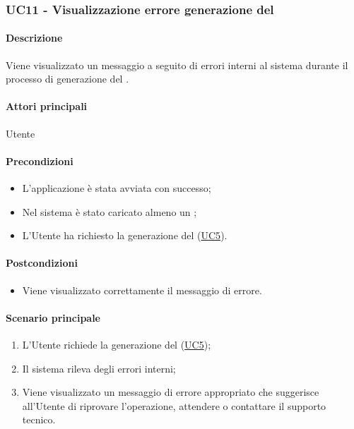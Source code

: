 \subsubsection{UC11 - Visualizzazione errore generazione del }\label{UC11}
\paragraph*{Descrizione}
Viene visualizzato un messaggio a seguito di errori interni al sistema durante il processo di generazione del .

\paragraph*{Attori principali}
Utente

\paragraph*{Precondizioni}
\begin{itemize}
  \item L'applicazione è stata avviata con successo;
  \item Nel sistema è stato caricato almeno un ;
  \item L'Utente ha richiesto la generazione del  (\hyperref[UC5]{UC5}).  
\end{itemize}

\paragraph*{Postcondizioni}
\begin{itemize}
  \item Viene visualizzato correttamente il messaggio di errore.
\end{itemize}

\paragraph*{Scenario principale}
\begin{enumerate}
  \item L'Utente richiede la generazione del  (\hyperref[UC5]{UC5});
  \item Il sistema rileva degli errori interni;
  \item Viene visualizzato un messaggio di errore appropriato che suggerisce all'Utente di riprovare l'operazione, attendere o contattare il supporto tecnico.
\end{enumerate}
